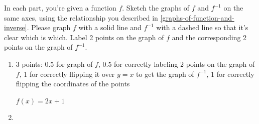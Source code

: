 \documentclass{article}
\begin{document}
\begin{enumerate}
\begin{enumerate}
    In each part, you're given a function $f$. Sketch the graphs of $f$ and $f^{-1}$ on the same axes, using the relationship you described in \ref{graphs-of-function-and-inverse}. Please graph $f$ with a solid line and $f^{-1}$ with a dashed line so that it's clear which is which. Label 2 points on the graph of $f$ and the corresponding 2 points on the graph of $f^{-1}$.

    \begin{enumerate}
    \item

      \begin{grading}
        3 points: 0.5 for graph of $f$, 0.5 for correctly labeling 2
        points on the graph of $f$, 1 for correctly flipping it over
        $y = x$ to get the graph of $f^{-1}$, 1 for correctly flipping
        the coordinates of the points
      \end{grading}

      \begin{problem}[\vfill]
        $f(x) = 2x + 1$
      \end{problem}

      \begin{solution}
        \begin{center}
        \end{center}
      \end{solution}

    \item


\end{enumerate}
\end{enumerate}
\end{enumerate}
\end{document}
